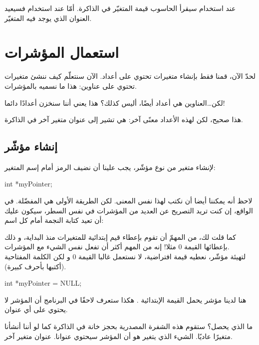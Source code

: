 عند استخدام
سيقرأ الحاسوب قيمة المتغيّر في الذاكرة. أمّا عند استخدام
فسيعيد العنوان الذي يوجد فيه المتغيّر.

\section{استعمال المؤشرات}

لحدّ الآن، قمنا فقط بإنشاء متغيرات تحتوي على أعداد. الآن سنتعلّم كيف ننشئ متغيرات تحتوي على عناوين: هذا ما نسميه بالمؤشرات.

\begin{question}
	لكن\dots العناوين هي أعداد أيضًا، أليس كذلك؟ هذا يعني أننا سنخزن أعدادًا دائما!
\end{question}

هذا صحيح، لكن لهذه الأعداد معنًى آخر: هي تشير إلى عنوان متغير آخر في الذاكرة.

\subsection{إنشاء مؤشّر}

لإنشاء متغير من نوع مؤشّر، يجب علينا أن نضيف الرمز
\InlineCode{*}
أمام إسم المتغير:

\begin{Csource}
int *myPointer;
\end{Csource}

\begin{information}
لاحظ أنه يمكننا أيضا أن نكتب
لهذا نفس المعنى. لكن الطريقة الأولى هي المفضّلة. في الواقع، إن كنت تريد التصريح عن العديد من المؤشرات في نفس السطر، سيكون عليك أن تعيد كتابة النجمة أمام كل اسم:
\end{information}

كما قلت لك، من المهمّ أن تقوم بإعطاء قيم إبتدائية للمتغيرات منذ البداية، و ذلك بإعطائها القيمة 0 مثلا! إنه من المهم أكثر أن تفعل نفس الشيء مع المؤشرات.\\
لتهيئة مؤشّر، نعطيه قيمة افتراضية، لا نستعمل غالبا القيمة 0 و لكن الكلمة المفتاحية
(أكتبها بأحرف كبيرة).

\begin{Csource}
int *myPointer = NULL;
\end{Csource}

هنا لدينا مؤشر يحمل القيمة الإبتدائية
.
هكذا ستعرف لاحقًا في البرنامج أن المؤشر لا يحتوي على أي عنوان.

ما الذي يحصل؟ ستقوم هذه الشفرة المصدرية بحجز خانة في الذاكرة كما لو أننا أنشأنا متغيرًا عاديًا. الشيء الذي يتغير هو أن المؤشر سيحتوي عنوانا. عنوان متغير آخر.

